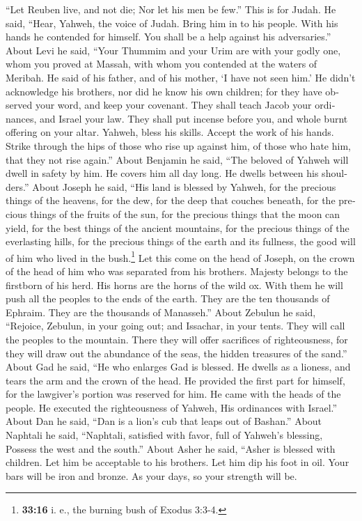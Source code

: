 \begin{paracol}{2}
\begin{otherlanguage}{english}
 ``Let Reuben live, and not die; Nor let his men be few.''
 This is for Judah. He said, ``Hear, Yahweh, the voice of
Judah. Bring him in to his people. With his hands he contended for
himself. You shall be a help against his adversaries.'' 
About Levi he said, ``Your Thummim and your Urim are with your godly
one, whom you proved at Massah, with whom you contended at the waters of
Meribah.  He said of his father, and of his mother, `I
have not seen him.' He didn't acknowledge his brothers, nor did he know
his own children; for they have observed your word, and keep your
covenant.  They shall teach Jacob your ordinances, and
Israel your law. They shall put incense before you, and whole burnt
offering on your altar.  Yahweh, bless his skills. Accept
the work of his hands. Strike through the hips of those who rise up
against him, of those who hate him, that they not rise again.''
 About Benjamin he said, ``The beloved of Yahweh will
dwell in safety by him. He covers him all day long. He dwells between
his shoulders.''  About Joseph he said, ``His land is
blessed by Yahweh, for the precious things of the heavens, for the dew,
for the deep that couches beneath,  for the precious
things of the fruits of the sun, for the precious things that the moon
can yield,  for the best things of the ancient mountains,
for the precious things of the everlasting hills,  for
the precious things of the earth and its fullness, the good will of him
who lived in the bush.\footnote{\textbf{33:16} i. e., the burning bush
  of Exodus 3:3-4.} Let this come on the head of Joseph, on the crown of
the head of him who was separated from his brothers. 
Majesty belongs to the firstborn of his herd. His horns are the horns of
the wild ox. With them he will push all the peoples to the ends of the
earth. They are the ten thousands of Ephraim. They are the thousands of
Manasseh.''  About Zebulun he said, ``Rejoice, Zebulun,
in your going out; and Issachar, in your tents.  They
will call the peoples to the mountain. There they will offer sacrifices
of righteousness, for they will draw out the abundance of the seas, the
hidden treasures of the sand.''  About Gad he said, ``He
who enlarges Gad is blessed. He dwells as a lioness, and tears the arm
and the crown of the head.  He provided the first part
for himself, for the lawgiver's portion was reserved for him. He came
with the heads of the people. He executed the righteousness of Yahweh,
His ordinances with Israel.''  About Dan he said, ``Dan
is a lion's cub that leaps out of Bashan.''  About
Naphtali he said, ``Naphtali, satisfied with favor, full of Yahweh's
blessing, Possess the west and the south.''  About Asher
he said, ``Asher is blessed with children. Let him be acceptable to his
brothers. Let him dip his foot in oil.  Your bars will be
iron and bronze. As your days, so your strength will be.


\end{otherlanguage}
\end{paracol}
